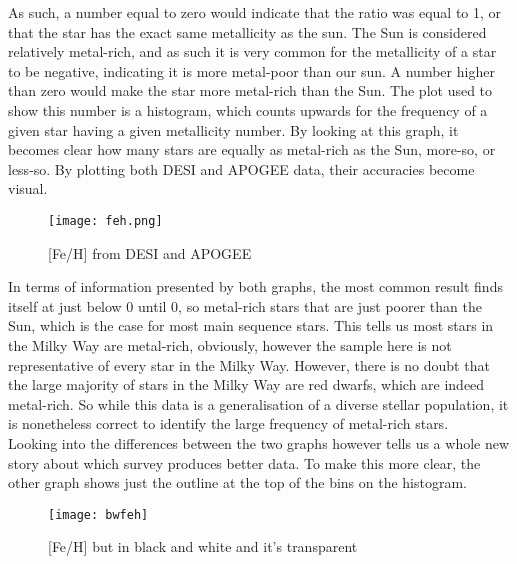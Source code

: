 \documentclass{article}
\begin{document}
\indent As such, a number equal to zero would indicate that the ratio was equal to 1, or that the star has the exact same metallicity as the sun. The Sun is considered relatively metal-rich, and as such it is very common for the metallicity of a star to be negative, indicating it is more metal-poor than our sun. A number higher than zero would make the star more metal-rich than the Sun. The plot used to show this number is a histogram, which counts upwards for the frequency of a given star having a given metallicity number. By looking at this graph, it becomes clear how many stars are equally as metal-rich as the Sun, more-so, or less-so. By plotting both DESI and APOGEE data, their accuracies become visual. \begin{figure}[H]
    \centering
    \texttt{[image: feh.png]}
    \caption{[Fe/H] from DESI and APOGEE }
    \label{fig:1}
\end{figure}
\indent In terms of information presented by both graphs, the most common result finds itself at just below 0 until 0, so metal-rich stars that are just poorer than the Sun, which is the case for most main sequence stars. This tells us most stars in the Milky Way are metal-rich, obviously, however the sample here is not representative of every star in the Milky Way. However, there is no doubt that the large majority of stars in the Milky Way are red dwarfs, which are indeed metal-rich. So while this data is a generalisation of a diverse stellar population, it is nonetheless correct to identify the large frequency of metal-rich stars.\\
\indent Looking into the differences between the two graphs however tells us a whole new story about which survey produces better data. To make this more clear, the other graph shows just the outline at the top of the bins on the histogram.\\
\begin{figure}[h!tbp]
    \centering
    \texttt{[image: bwfeh]}
    \caption{[Fe/H] but in black and white and it's transparent}
    \label{fig:2}
\end{figure}
\end{document}
